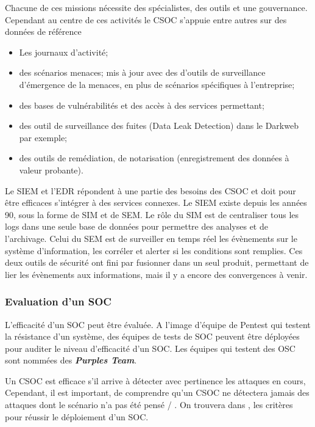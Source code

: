 Chacune de ces missions nécessite des spécialistes, des outils et une gouvernance. Cependant au centre de ces activités  le CSOC s’appuie entre autres sur des données de référence
\begin{itemize}
  \item Les journaux d'activité;
  \item des scénarios menaces; mis à jour avec des d'outils de surveillance d'émergence de la menaces, en plus de scénarios spécifiques à l'entreprise;
  \item des bases de vulnérabilités et des accès à des services permettant;
  \item des outil de surveillance des fuites (Data Leak Detection) dans le Darkweb par exemple;
  \item des outils de remédiation, de notarisation (enregistrement des données à valeur probante).
\end{itemize}

Le SIEM et l'EDR répondent à une partie des besoins des CSOC et doit pour être efficaces s'intégrer à des services connexes.
Le SIEM existe depuis les années 90, sous la forme de SIM et de SEM. Le rôle du SIM est de centraliser tous les logs dans une seule base de données pour permettre des analyses et de l’archivage. Celui du SEM est de surveiller en temps réel les évènements sur le système d’information, les corréler et alerter si les conditions sont remplies. Ces deux outils de sécurité ont fini par fusionner dans un seul produit, permettant de lier les évènements aux informations, mais il y a encore des convergences à venir.

\subsubsection{Evaluation d'un SOC}

L'efficacité d'un SOC peut être évaluée. A l'image d'équipe de Pentest qui testent la résistance d'un système, des équipes de tests de SOC peuvent être déployées pour auditer le niveau d'efficacité d'un SOC.
Les équipes qui testent des OSC sont nommées des \textbf{\textit{Purples Team}}.

Un CSOC est efficace s’il arrive à détecter avec pertinence les attaques en cours,  Cependant, il est important, de comprendre qu’un CSOC ne détectera jamais  des attaques dont le scénario n'a pas été pensé / . On trouvera dans , les critères pour réussir le déploiement d'un SOC.

